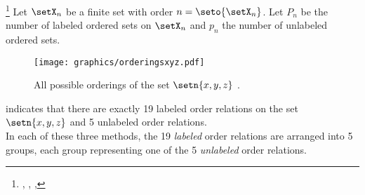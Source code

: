 \begin{proposition}
\footnote{
  ,
  ,
  ,
  }
\label{prop:num_posets}
Let $\setX_n$ be a finite set with order $n=\seto{\setX_n}$.
Let $P_n$ be the number of labeled ordered sets on $\setX_n$
and $p_n$ the number of unlabeled  ordered sets.
\end{proposition}


\begin{figure}[th]
\begin{center}
%
\texttt{[image: graphics/orderingsxyz.pdf]}%
%
\end{center}
\caption{
  All possible orderings of the set $\setn{x,y,z}$ .
  \label{fig:num_posets_xyz}
  }
\end{figure}

\begin{example}  %
\label{ex:num_posets_xyz}
 indicates that there are exactly
19 labeled order relations on the set $\setn{x,y,z}$ and 5 unlabeled order relations.
\\
In each of these three methods, the 19 \emph{labeled} order relations are arranged into 5 groups,
each group representing one of the 5 \emph{unlabeled} order relations.
\end{example}

